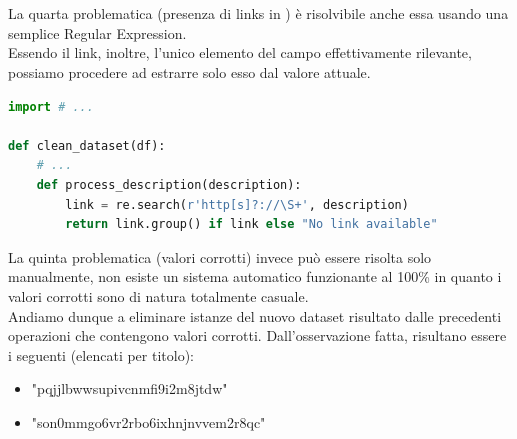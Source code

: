 \documentclass[a4paper,12pt]{report}
\begin{document}
\\
\\
La quarta problematica (presenza di links in \texttt{\color{red}{description}}) è risolvibile anche essa usando una semplice Regular Expression.
\\
Essendo il link, inoltre, l'unico elemento del campo effettivamente rilevante, possiamo procedere ad estrarre solo esso dal valore attuale.
\begin{lstlisting}[language=Python]
import # ...

def clean_dataset(df):
    # ...
    def process_description(description):
        link = re.search(r'http[s]?://\S+', description)
        return link.group() if link else "No link available"
\end{lstlisting}
\newpage
La quinta problematica (valori corrotti) invece può essere risolta solo manualmente, non esiste un sistema automatico funzionante al 100\% in quanto i valori corrotti sono di natura totalmente casuale.\\
Andiamo dunque a eliminare istanze del nuovo dataset risultato dalle precedenti operazioni che contengono valori corrotti. Dall'osservazione fatta, risultano essere i seguenti (elencati per titolo):
\begin{itemize}
    \item "pqjjlbwwsupivcnmfi9i2m8jtdw"
    \item "son0mmgo6vr2rbo6ixhnjnvvem2r8qc"
\end{itemize}
\end{document}
